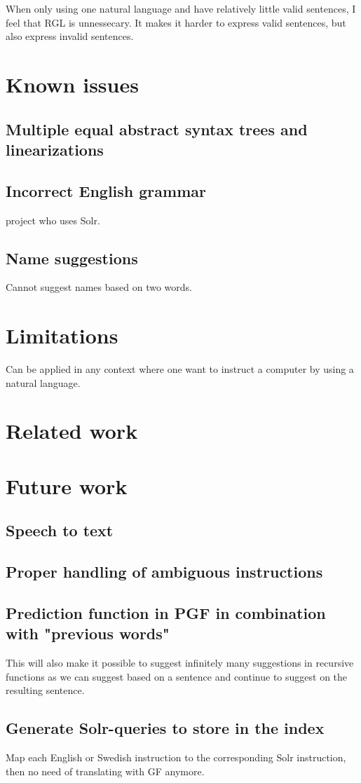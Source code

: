 When only using one natural language and have relatively little valid sentences, I feel that RGL is unnessecary. It makes it harder to express valid sentences, but also express invalid sentences.


\section{Known issues}\label{sec:known-issues}
\subsection{Multiple equal abstract syntax trees and linearizations}
\subsection{Incorrect English grammar}
project who uses Solr.
\subsection{Name suggestions}
Cannot suggest names based on two words.

\section{Limitations}
Can be applied in any context where one want to instruct a computer by using a natural language.
\section{Related work}
\section{Future work}
\subsection{Speech to text}
\subsection{Proper handling of ambiguous instructions}
\subsection{Prediction function in PGF in combination with "previous words"}
This will also make it possible to suggest infinitely many suggestions in recursive functions as we can suggest based on a sentence and continue to suggest on the resulting sentence.
\subsection{Generate Solr-queries to store in the index}
Map each English or Swedish instruction to the corresponding Solr instruction, then no need of translating with GF anymore.